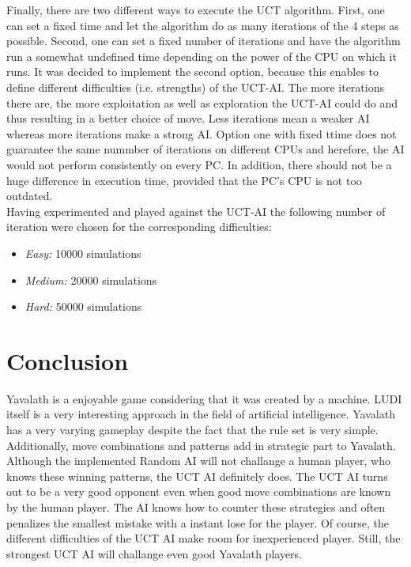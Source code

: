 \documentclass[english]{report} \usepackage[english]{babel}
\begin{document}
Finally, there are two different ways to execute the UCT algorithm. First, one
can set a fixed time and let the algorithm do as many iterations of the 4 steps
as possible. Second, one can set a fixed number of iterations and have the
algorithm run a somewhat undefined time depending on the power of the CPU on
which it runs. It was decided to implement the second option, because this
enables to define different difficulties (i.e. strengths) of the UCT-AI.
The more iterations there are, the more exploitation as well as exploration the
UCT-AI could do and thus resulting in a better choice of move. Less iterations
mean a weaker AI whereas more iterations make a strong AI. Option one with fixed
ttime does not guarantee the same nummber of iterations on different CPUs and
herefore, the AI would not perform consistently on every PC. In addition, there
should not be a huge difference in execution time, provided that the PC's CPU is
not too outdated. \\

Having experimented and played against the UCT-AI the following number of
iteration were chosen for the corresponding difficulties:
\begin{itemize}
	\item \textit{Easy:} 10000 simulations
	\item \textit{Medium:}  20000 simulations
	\item \textit{Hard:}  50000 simulations
\end{itemize}


\chapter{Conclusion}
Yavalath is a enjoyable game considering that it was created by a machine. LUDI
itself is a very interesting approach in the field of artificial intelligence.
Yavalath has a very varying gameplay despite the fact that the rule set is very
simple. Additionally, move combinations and patterns add in strategic part to
Yavalath. Although the implemented Random AI will not challange a human player,
who knows these winning patterns, the UCT AI definitely does. The UCT AI turns
out to be a very good opponent even when good move combinations are known by the
human player. The AI knows how to counter these strategies and often penalizes
the smallest mistake with a instant lose for the player. Of course, the
different difficulties of the UCT AI make room for inexperienced player. Still,
the strongest UCT AI will challange even good Yavalath players.

\end{document}

